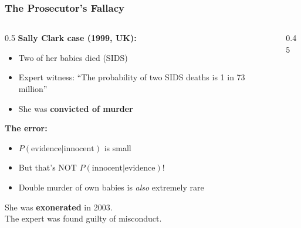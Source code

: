 \documentclass[aspectratio=169]{beamer}
\begin{document}
\begin{frame}
\frametitle{The Prosecutor's Fallacy}

\begin{columns}[T]
\begin{column}{0.5\textwidth}
\vspace{0.2cm}
\textbf{Sally Clark case (1999, UK):}
\begin{itemize}
  \item Two of her babies died (SIDS)
  \item Expert witness: ``The probability of two SIDS deaths is 1 in 73 million''
  \item She was \textbf{convicted of murder}
\end{itemize}

\vspace{0.2cm}
\textbf{The error:}
\begin{itemize}
  \item $P(\text{evidence}|\text{innocent})$ is small
  \item But that's NOT $P(\text{innocent}|\text{evidence})$!
  \item Double murder of own babies is \textit{also} extremely rare
\end{itemize}

\vspace{0.1cm}
{\small She was \textcolor{paramgreen}{\textbf{exonerated}} in 2003. \\
The expert was found guilty of misconduct.}
\end{column}
\begin{column}{0.45\textwidth}
\vspace{0.3cm}
\end{column}
\end{columns}
\end{frame}
\end{document}
